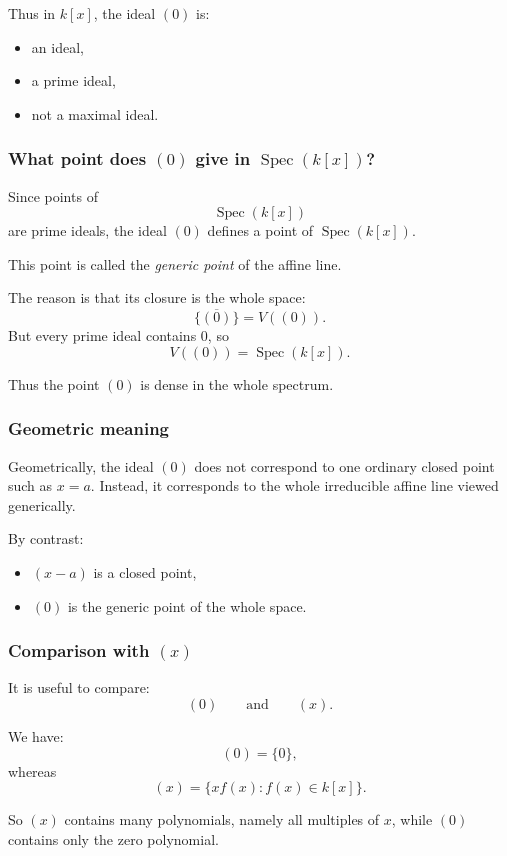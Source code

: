 \documentclass[12pt,a4paper]{article}
\theoremstyle{notespace}
\newcommand{\Spec}{\operatorname{Spec}}
\theoremstyle{definition}
\begin{document}
Thus in \(k[x]\), the ideal \((0)\) is:

\begin{itemize}
	\item an ideal,
	\item a prime ideal,
	\item not a maximal ideal.
\end{itemize}

\subsubsection{What point does \((0)\) give in \(\Spec(k[x])\)?}

Since points of
\[
\Spec(k[x])
\]
are prime ideals, the ideal \((0)\) defines a point of \(\Spec(k[x])\).

This point is called the \emph{generic point} of the affine line.

The reason is that its closure is the whole space:
\[
\overline{\{(0)\}} = V((0)).
\]
But every prime ideal contains \(0\), so
\[
V((0))=\Spec(k[x]).
\]

Thus the point \((0)\) is dense in the whole spectrum.

\subsubsection{Geometric meaning}

Geometrically, the ideal \((0)\) does not correspond to one ordinary closed point such as \(x=a\).  
Instead, it corresponds to the whole irreducible affine line viewed generically.

By contrast:

\begin{itemize}
	\item \((x-a)\) is a closed point,
	\item \((0)\) is the generic point of the whole space.
\end{itemize}

\subsubsection{Comparison with \((x)\)}

It is useful to compare:
\[
(0)
\qquad\text{and}\qquad
(x).
\]

We have:
\[
(0)=\{0\},
\]
whereas
\[
(x)=\{x f(x): f(x)\in k[x]\}.
\]

So \((x)\) contains many polynomials, namely all multiples of \(x\), while \((0)\) contains only the zero polynomial.
\end{document}
